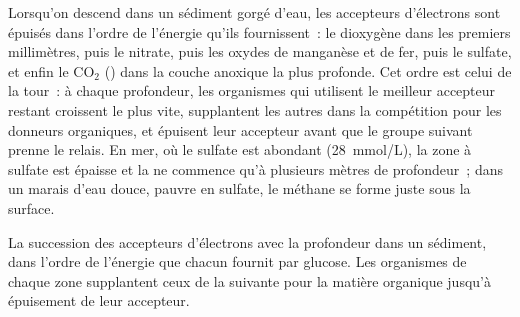\begin{proposition}\label{prop:b2:microbial-metabolism:sequence}
Lorsqu'on descend dans un sédiment gorgé d'eau, les accepteurs
d'électrons sont épuisés dans l'ordre de l'énergie qu'ils fournissent~:
le dioxygène dans les premiers millimètres, puis le nitrate, puis les
oxydes de manganèse et de fer, puis le sulfate, et enfin le
$\mathrm{CO_2}$ () dans la couche anoxique la plus
profonde. Cet ordre est celui de la tour~: à chaque profondeur, les
organismes qui utilisent le meilleur accepteur restant croissent le
plus vite, supplantent les autres dans la compétition pour les donneurs
organiques, et épuisent leur accepteur avant que le groupe suivant
prenne le relais. En mer, où le sulfate est abondant
(\qty{28}{mmol/L}), la zone à sulfate est épaisse et la 
ne commence qu'à plusieurs mètres de profondeur~; dans un marais d'eau
douce, pauvre en sulfate, le méthane se forme juste sous la surface.
\end{proposition}

\begin{omfigure}

{\small La succession des accepteurs d'électrons avec la profondeur dans
un sédiment, dans l'ordre de l'énergie que chacun fournit par glucose.
Les organismes de chaque zone supplantent ceux de la suivante pour la
matière organique jusqu'à épuisement de leur accepteur.}
\end{omfigure}

